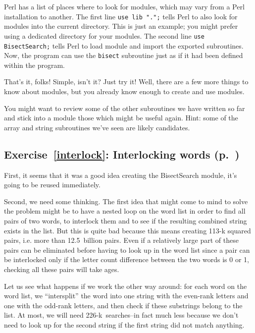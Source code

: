 Perl has a list of places where to look for modules, 
which may vary from a Perl installation to another. 
The first line {\tt use lib ".";} tells Perl to also 
look for modules into the current directory. This is 
just an example; you might prefer using a dedicated 
directory for your modules. The 
second line {\tt use BisectSearch;} tells Perl to 
load module and import the exported subroutines. Now, 
the program can use the {\tt bisect} subroutine just as if 
it had been defined within the program.

That's it, folks! Simple, isn't it? Just try it! Well, there 
are a few more things to know about modules, but you 
already know enough to create and use modules. 

You might want to review some of the other subroutines we 
have written so far and stick into a module those which 
might be useful again. Hint: some of the array and string 
subroutines we've seen are likely candidates.

\subsection{Exercise~\ref{interlock}: Interlocking words (p.~\pageref{interlock})}
\label{sol_interlock}

First, it seems that it was a good idea creating the 
BisectSearch module, it's going to be reused immediately.

Second, we need some thinking. The first idea that might 
come to mind to solve the problem might be to have a 
nested loop on the word list in order to find all pairs 
of two words, to interlock them and to see if the resulting 
combined string exists in the list. But this is quite bad 
because this means creating 113-k squared pairs, i.e. more 
than 12.5~billion pairs. Even if a relatively large part 
of these pairs can be eliminated before having to look up in 
the word list since a pair can be interlocked only if the 
letter count difference between the two words is 0 or 1, 
checking all these pairs will take ages.

Let us see what happens if we work the other way around: for 
each word on the word list, we ``intersplit'' the word into 
one string with the even-rank letters and one with the odd-rank 
letters, and then check if these substrings belong to the 
list. At most, we will need 226-k~searches--in fact much less 
because we don't need to look up for the second string if the 
first string did not match anything.

